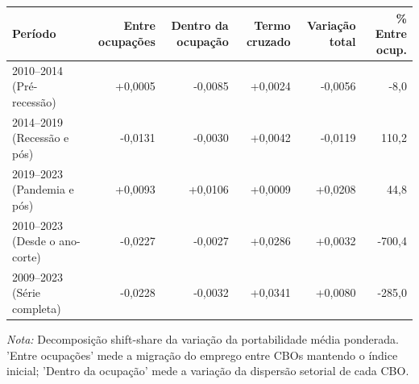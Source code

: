 \providecommand{\toprule}{\hline\hline}
\providecommand{\midrule}{\hline}
\providecommand{\bottomrule}{\hline\hline}
\providecommand{\addlinespace}[1][]{}
{\small
\renewcommand{\arraystretch}{1.12}
\begin{tabular}{lrrrrr}
\toprule
Período & Entre ocupações & Dentro da ocupação & Termo cruzado & Variação total & \% Entre ocup. \\
\midrule
2010–2014 (Pré-recessão) & +0,0005 & -0,0085 & +0,0024 & -0,0056 & -8,0 \\
2014–2019 (Recessão e pós) & -0,0131 & -0,0030 & +0,0042 & -0,0119 & 110,2 \\
2019–2023 (Pandemia e pós) & +0,0093 & +0,0106 & +0,0009 & +0,0208 & 44,8 \\
2010–2023 (Desde o ano-corte) & -0,0227 & -0,0027 & +0,0286 & +0,0032 & -700,4 \\
2009–2023 (Série completa) & -0,0228 & -0,0032 & +0,0341 & +0,0080 & -285,0 \\
\bottomrule
\end{tabular}
\vspace{2pt}
\par{\footnotesize \textit{Nota:} Decomposição shift-share da variação da portabilidade média ponderada. 'Entre ocupações' mede a migração do emprego entre CBOs mantendo o índice inicial; 'Dentro da ocupação' mede a variação da dispersão setorial de cada CBO.}
}
